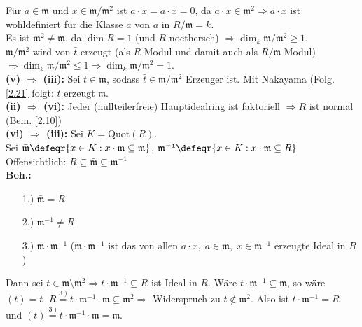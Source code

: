\begin{Bew}
Für $a \in \mathfrak{m}$ und $x \in \mathfrak{m}/\mathfrak{m}^2$ ist $a \cdot
\bar{x} = \overline{a \cdot x} = 0$, da $a \cdot x \in \mathfrak{m}^2
\Rightarrow \bar{a} \cdot \bar{x}$ ist wohldefiniert für die Klasse $\bar{a}$
von $a$ in $R/\mathfrak{m} = k$.\\
Es ist $\mathfrak{m}^2 \not= \mathfrak{m}$, da $\dim R = 1$ (und $R$ noethersch)
$\Rightarrow \dim_k \mathfrak{m} / \mathfrak{m}^2 \geq 1$.\\
$\mathfrak{m}/\mathfrak{m}^2$ wird von $\bar{t}$ erzeugt (als $R$-Modul und
damit auch als $R/\mathfrak{m}$-Modul) $\Rightarrow \dim_k \mathfrak{m}/
\mathfrak{m}^2 \leq 1 \Rightarrow \dim_k \mathfrak{m}/\mathfrak{m}^2 = 1$.\\
\textbf{(v) $\Rightarrow$ (iii):} Sei $t \in \mathfrak{m}$, sodass $\bar{t} \in
\mathfrak{m}/\mathfrak{m}^2$ Erzeuger ist. Mit Nakayama (Folg. \ref{2.21} folgt:
$t$ erzeugt $\mathfrak{m}$.\\
\textbf{(ii) $\Rightarrow$ (vi):} Jeder (nullteilerfreie) Hauptidealring ist
faktoriell $\Rightarrow R$ ist normal (Bem. \ref{2.10})\\
\textbf{(vi) $\Rightarrow$ (iii):} Sei $K = \mathrm{Quot}(R)$.\\
Sei $\bar{\mathfrak{m}} \defeqr \{x \in K: x \cdot \mathfrak{m} \subseteq
\mathfrak{m}\}$, $\mathfrak{m^{-1}} \defeqr \{x \in K: x \cdot \mathfrak{m}
\subseteq R\}$\\
Offensichtlich: $R \subseteq \bar{\mathfrak{m}} \subseteq \mathfrak{m}^{-1}$\\
\textbf{Beh.:} \begin{enumerate}
  \item[1.)] $\bar{\mathfrak{m}} = R$
  \item[2.)] $\mathfrak{m}^{-1} \not= R$
  \item[3.)] $\mathfrak{m} \cdot \mathfrak{m}^{-1}$ ($\mathfrak{m} \cdot
  \mathfrak{m}^{-1}$ ist das von allen $a \cdot x, \; a \in \mathfrak{m}, \; x
  \in \mathfrak{m}^{-1}$ erzeugte Ideal in $R$)
\end{enumerate}
Dann sei $t \in \mathfrak{m} \setminus \mathfrak{m}^2 \Rightarrow t \cdot
\mathfrak{m}^{-1} \subseteq R$ ist Ideal in $R$.
Wäre $ t \cdot \mathfrak{m}^{-1} \subseteq \mathfrak{m}$, so wäre $(t) = t \cdot
R \overset{3.)}{=} t \cdot \mathfrak{m}^{-1} \cdot \mathfrak{m} \subseteq
\mathfrak{m}^2 \Rightarrow$ Widerspruch zu $t \not\in \mathfrak{m}^2$.
Also ist $t \cdot \mathfrak{m}^{-1} = R$ und $(t) \overset{3.)}{=} t \cdot
\mathfrak{m}^{-1} \cdot \mathfrak{m} = \mathfrak{m}$.\\

\end{Bew}
